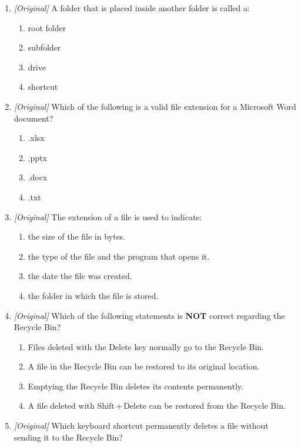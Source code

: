 \documentclass[11pt]{article}
\begin{document}
\begin{enumerate}[label=\textbf{Q\arabic*.}, leftmargin=*]
\begin{enumerate}[label=\Alph*.]
  \end{enumerate}
\item \textit{[Original]} A folder that is placed inside another folder is
  called a:
  \begin{enumerate}[label=\Alph*.]
    \item root folder
    \item subfolder
    \item drive
    \item shortcut
  \end{enumerate}
\item \textit{[Original]} Which of the following is a valid file extension
  for a Microsoft Word document?
  \begin{enumerate}[label=\Alph*.]
    \item .xlsx
    \item .pptx
    \item .docx
    \item .txt
  \end{enumerate}
\item \textit{[Original]} The extension of a file is used to indicate:
  \begin{enumerate}[label=\Alph*.]
    \item the size of the file in bytes.
    \item the type of the file and the program that opens it.
    \item the date the file was created.
    \item the folder in which the file is stored.
  \end{enumerate}
\item \textit{[Original]} Which of the following statements is \textbf{NOT}
  correct regarding the Recycle Bin?
  \begin{enumerate}[label=\Alph*.]
    \item Files deleted with the Delete key normally go to the Recycle Bin.
    \item A file in the Recycle Bin can be restored to its original location.
    \item Emptying the Recycle Bin deletes its contents permanently.
    \item A file deleted with Shift\,+\,Delete can be restored from the
      Recycle Bin.
  \end{enumerate}
\item \textit{[Original]} Which keyboard shortcut permanently deletes a file
  without sending it to the Recycle Bin?
  \begin{enumerate}[label=\Alph*.]

\end{enumerate}
\end{enumerate}
\end{document}

